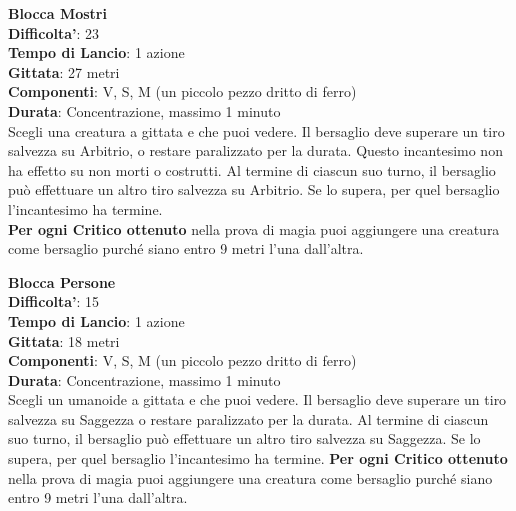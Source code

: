 \begin{multicols}{2}
\medskip\textbf{Blocca Mostri}\\
\textbf{Difficolta'}: 23\\
\textbf{Tempo di Lancio}: 1 azione\\
\textbf{Gittata}: 27 metri\\
\textbf{Componenti}: V, S, M (un piccolo pezzo dritto di ferro)\\
\textbf{Durata}: Concentrazione, massimo 1 minuto\\
Scegli una creatura a gittata e che puoi vedere. Il bersaglio deve superare un tiro salvezza su Arbitrio, o restare paralizzato per la durata. Questo incantesimo non ha effetto su non morti o costrutti. Al termine di ciascun suo turno, il bersaglio può effettuare un altro tiro salvezza su Arbitrio. Se lo supera, per quel bersaglio l’incantesimo ha termine.\\
\textbf{Per ogni Critico ottenuto} nella prova di magia puoi aggiungere una creatura come bersaglio purché siano entro 9 metri l’una dall’altra.


\medskip\textbf{Blocca Persone}\\
\textbf{Difficolta'}: 15\\
\textbf{Tempo di Lancio}: 1 azione\\
\textbf{Gittata}: 18 metri\\
\textbf{Componenti}: V, S, M (un piccolo pezzo dritto di ferro)\\
\textbf{Durata}: Concentrazione, massimo 1 minuto\\
Scegli un umanoide a gittata e che puoi vedere. Il bersaglio deve superare un tiro salvezza su Saggezza o restare paralizzato per la durata. Al termine di ciascun suo turno, il bersaglio può effettuare un altro tiro salvezza su Saggezza. Se lo supera, per quel bersaglio l’incantesimo ha termine.
\textbf{Per ogni Critico ottenuto} nella prova di magia puoi aggiungere una creatura come bersaglio purché siano entro 9 metri l’una dall’altra.



\end{multicols}
